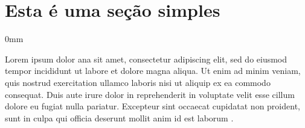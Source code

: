 \documentclass[./main.tex]{subfiles}
\begin{document}
\section{Esta é uma seção simples} \label{sec_a}

\begin{adjustwidth}{\bodytab}{0mm}

\par Lorem ipsum dolor \acrshort{ana} sit amet, consectetur adipiscing elit, sed do eiusmod tempor incididunt ut labore et dolore magna aliqua. Ut enim ad minim veniam, quis nostrud exercitation ullamco laboris nisi ut aliquip ex ea commodo consequat. Duis aute irure dolor in reprehenderit in voluptate velit esse cillum dolore eu fugiat nulla pariatur. Excepteur sint occaecat cupidatat non proident, sunt in culpa qui officia deserunt mollit anim id est laborum \cite{Pearce2002a}.

\end{adjustwidth}

\clearpage
\end{document}
